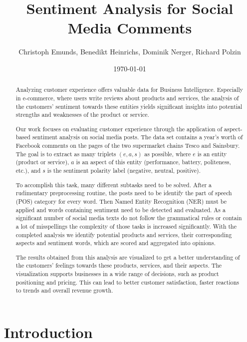 \documentclass[10pt,a4paper]{article}
\title{\Huge{Sentiment Analysis for Social Media Comments}}
\author{Christoph Emunds, Benedikt Heinrichs, Dominik Nerger, Richard Polzin}
\date{\today}
\begin{document}
	
	\maketitle
	\begin{abstract}
	Analyzing customer experience offers valuable data for Business Intelligence. Especially in e-commerce, where users write reviews about products and services, the analysis of the customers' sentiment towards these entities yields significant insights into potential strengths and weaknesses of the product or service.

	Our work focuses on evaluating customer experience through the application of aspect-based sentiment analysis on social media posts. The data set contains a year's worth of Facebook comments on the pages of the two supermarket chains Tesco and Sainsbury. The goal is to extract as many triplets $(e, a, s)$ as possible, where $e$ is an entity (product or service), $a$ is an aspect of this entity (performance, battery, politeness, etc.), and $s$ is the sentiment polarity label (negative, neutral, positive).

	To accomplish this task, many different subtasks need to be solved. After a rudimentary preprocessing routine, the posts need to be identify the part of speech (POS) category for every word. Then Named Entity Recognition (NER) must be applied and words containing sentiment need to be detected and evaluated. As a significant number of social media texts do not follow the grammatical rules or contain a lot of misspellings the complexity of those tasks is increased significantly. With the completed analysis we identify potential products and services, their corresponding aspects and sentiment words, which are scored and aggregated into opinions.

	The results obtained from this analysis are visualized to get a better understanding of the customers' feelings towards these products, services, and their aspects. The visualization supports businesses in a wide range of decisions, such as product positioning and pricing. This can lead to better customer satisfaction, faster reactions to trends and overall revenue growth.
	\end{abstract}
	
	\newpage
	\tableofcontents
	\newpage
	
	\section{Introduction}
	
\end{document}
